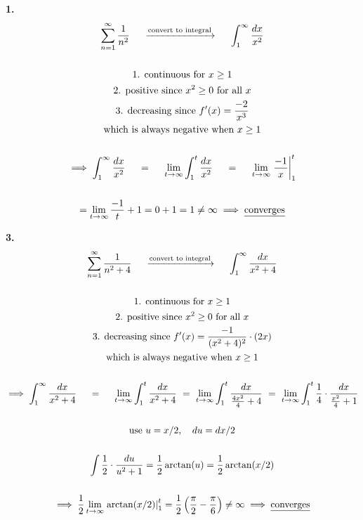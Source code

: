 \documentclass{article}
\begin{document}
\noindent
\textbf{
1.
}
\\
\begin{gather*}
\sum_{n=1}^{\infty} \frac{1}{n^2}
~~~~\xrightarrow{\text{convert to integral}}~~~~
\int_1^{\infty} \frac{dx}{x^2}
\\
\\
\text{1. continuous for } x \geq 1
\\
\text{2. positive since } x^2 \geq 0 \text{ for all } x
\\
\text{3. decreasing since }
f'(x)=\frac{-2}{x^3}
\\
\text{which is always negative when } x \geq 1
\\
\\
\implies
\int_1^{\infty} \frac{dx}{x^2}
~~~~=~~~~
\lim_{t \to \infty}
\int_1^t \frac{dx}{x^2}
~~~~=~~~~
\lim_{t \to \infty}
\left. \frac{-1}{x} \right|_1^t
\\
\\
=\lim_{t \to \infty}
\frac{-1}{t} + 1=0+1=1 \neq \infty
\implies \text{\underline{converges}}
\end{gather*}

\noindent
\textbf{
3.
}
\\
\begin{gather*}
\sum_{n=1}^{\infty} \frac{1}{n^2+4}
~~~~\xrightarrow{\text{convert to integral}}~~~~
\int_1^{\infty} \frac{dx}{x^2+4}
\\
\\
\text{1. continuous for } x \geq 1
\\
\text{2. positive since } x^2 \geq 0 \text{ for all } x
\\
\text{3. decreasing since }
f'(x)=\frac{-1}{(x^2+4)^2} \cdot (2x)
\\
\text{which is always negative when } x \geq 1
\\
\\
\implies
\int_1^{\infty} \frac{dx}{x^2+4}
~~~~=~~~~
\lim_{t \to \infty} \int_1^t \frac{dx}{x^2+4}
~=~
\lim_{t \to \infty} \int_1^t \frac{dx}{\frac{4x^2}{4}+4}
~=~
\lim_{t \to \infty} \int_1^t \frac{1}{4} \cdot \frac{dx}{\frac{x^2}{4}+1}
\\
\\
\text{use } u=x/2,
~~~
du=dx/2
\\
\\
\int \frac{1}{2} \cdot \frac{du}{u^2+1}
=\frac{1}{2} \arctan(u)
=\frac{1}{2} \arctan(x/2)
\\
\\
\implies
\frac{1}{2} \lim_{t \to \infty}
\left. \arctan(x/2) \right|_1^t
= \frac{1}{2} \left( \frac{\pi}{2} -\frac{\pi}{6} \right) \neq \infty
\implies \text{\underline{converges}}
\end{gather*}
\end{document}
